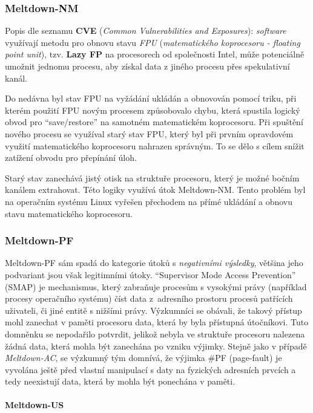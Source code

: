 \subsubsection{Meltdown-NM}

Popis dle seznamu \textbf{CVE} (\textit{Common Vulnerabilities and Exposures}): \textit{software} využívají metodu pro obnovu stavu \textit{FPU} (\textit{matematického koprocesoru - floating point unit}), tzv. \textbf{Lazy FP} na procesorech od společnosti Intel, může potenciálně umožnit jednomu procesu, aby získal data z jiného procesu přes spekulativní kanál.

Do nedávna byl stav FPU na vyžádání ukládán a obnovován pomocí triku, při kterém použití FPU novým procesem způsobovalo chybu, která spustila logický obvod pro \enquote{save/restore} na samotném matematickém koprocesoru.
Při spuštění nového procesu se využíval starý stav FPU, který byl při prvním opravdovém využití matematického koprocesoru nahrazen správným.
To se dělo s cílem snížit zatížení obvodu pro přepínání úloh.

Starý stav zanechává jistý otisk na struktuře procesoru, který je možné bočním kanálem extrahovat.
Této logiky využívá útok Meltdown-NM.
Tento problém byl na operačním systému Linux vyřešen přechodem na přímé ukládání a obnovu stavu matematického koprocesoru.

\subsubsection{Meltdown-PF}

Meltdown-PF sám spadá do kategorie útoků s \textit{negativními výsledky}, většina jeho podvariant jsou však legitimními útoky.
\enquote{Supervisor Mode Access Prevention} (SMAP) je mechanismus, který zabraňuje procesům s vysokými právy (například procesy operačního systému) číst data z~adresního prostoru procesů patřících uživateli, či jiné entitě s nižšími právy.
Výzkumníci se obávali, že takový přístup mohl zanechat v paměti procesoru data, která by byla přístupná útočníkovi.
Tuto domněnku se nepodařilo potvrdit, jelikož nebyla ve struktuře procesoru nalezena žádná data, která mohla být zanechána po vzniku výjimky.
Stejně jako v případě \textit{Meltdown-AC}, se výzkumný tým domnívá, že výjimka \#PF (page-fault) je vyvolána ještě před vlastní manipulací s daty na fyzických adresních prvcích a tedy neexistují data, která by mohla být ponechána v paměti.

\paragraph{Meltdown-US}

